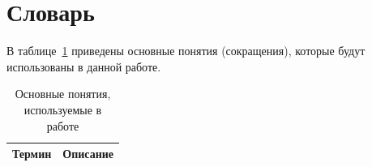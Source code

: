 \documentclass[a4paper,14pt]{extreport} %
\begin{document}
\newpage
\section{Словарь}
В таблице~\ref{tab:dict} приведены основные понятия (сокращения), которые будут использованы в данной работе.
\begin{table}[H]
	\centering
	\caption{Основные понятия, используемые в работе}\label{tab:dict}
	\begin{tabular}{|p{3cm}| p{10cm}|}
		\hline
		Термин & Описание                                                                                                                                                                                                                                                                                 \\ \hline
			

\end{tabular}
\end{table}
\end{document}
